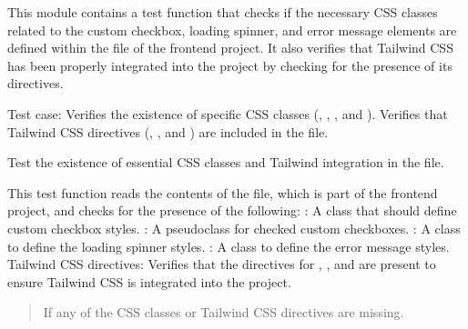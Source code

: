 \documentclass[letterpaper,10pt,english]{sphinxmanual}
\begin{document}
\sphinxAtStartPar
This module contains a test function that checks if the necessary CSS classes related to
the custom checkbox, loading spinner, and error message elements are defined within
the  file of the frontend project. It also verifies that Tailwind CSS has
been properly integrated into the project by checking for the presence of its directives.

\sphinxAtStartPar
Test case:
\sphinxhyphen{} Verifies the existence of specific CSS classes (, , , and ).
\sphinxhyphen{} Verifies that Tailwind CSS directives (, , and ) are included in the  file.

\begin{fulllineitems}
\label{\detokenize{test.frontend:test.frontend.test_index_css.test_custom_checkbox_class_exists}}
\pysigstartsignatures
\pysiglinewithargsret
{}
{}
{}
\pysigstopsignatures
\sphinxAtStartPar
Test the existence of essential CSS classes and Tailwind integration in the  file.

\sphinxAtStartPar
This test function reads the contents of the  file, which is part of the frontend
project, and checks for the presence of the following:
\sphinxhyphen{} : A class that should define custom checkbox styles.
\sphinxhyphen{} : A pseudo\sphinxhyphen{}class for checked custom checkboxes.
\sphinxhyphen{} : A class to define the loading spinner styles.
\sphinxhyphen{} : A class to define the error message styles.
\sphinxhyphen{} Tailwind CSS directives: Verifies that the  directives for , ,
and  are present to ensure Tailwind CSS is integrated into the project.
\begin{quote}\begin{description}
\sphinxAtStartPar
{} \textendash{} If any of the CSS classes or Tailwind CSS directives are missing.

\end{description}\end{quote}

\end{fulllineitems}
\end{document}
